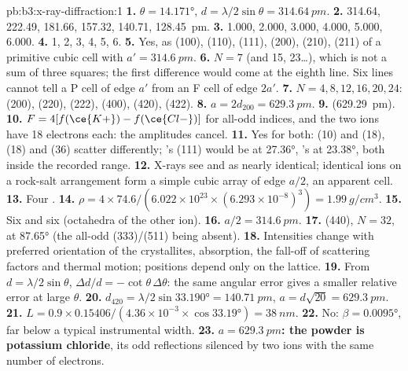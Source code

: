 \begin{solution}{pb:b3:x-ray-diffraction:1}
\textbf{1.} $\theta = \ang{14.171}$, $d = \lambda/2\sin\theta = \qty{314.64}{pm}$.
\textbf{2.} 314.64, 222.49, 181.66, 157.32, 140.71, \qty{128.45}{pm}.
\textbf{3.} 1.000, 2.000, 3.000, 4.000, 5.000, 6.000.
\textbf{4.} 1, 2, 3, 4, 5, 6.
\textbf{5.} Yes, as (100), (110), (111), (200), (210), (211) of a primitive cubic cell
with $a' = \qty{314.6}{pm}$.
\textbf{6.} $N = 7$ (and 15, 23\dots), which is not a sum of three squares; the
first difference would come at the eighth line. Six lines cannot tell a P
cell of edge $a'$ from an F cell of edge $2a'$.
\textbf{7.} $N = 4, 8, 12, 16, 20, 24$: (200), (220), (222), (400), (420), (422).
\textbf{8.} $a = 2d_{200} = \qty{629.3}{pm}$.
\textbf{9.}  (\qty{629.29}{pm}).
\textbf{10.} $F = 4[f(\ce{K+}) - f(\ce{Cl-})]$ for all-odd indices, and the two ions have 18
electrons each: the amplitudes cancel.
\textbf{11.} Yes for both:  (10) and  (18),  (18) and  (36)
scatter differently; 's (111) would be at \ang{27.36}, 's at \ang{23.38},
both inside the recorded range.
\textbf{12.} X-rays see  and  as nearly identical; identical ions on a
rock-salt arrangement form a simple cubic array of edge $a/2$, an apparent cell.
\textbf{13.} Four .
\textbf{14.} $\rho = 4 \times 74.6/(6.022\times10^{23} \times (6.293\times10^{-8})^3) =
\qty{1.99}{g/cm^3}$.
\textbf{15.} Six and six (octahedra of the other ion).
\textbf{16.} $a/2 = \qty{314.6}{pm}$.
\textbf{17.} (440), $N = 32$, at \ang{87.65} (the all-odd (333)/(511) being absent).
\textbf{18.} Intensities change with preferred orientation of the crystallites,
absorption, the fall-off of scattering factors and thermal motion; positions
depend only on the lattice.
\textbf{19.} From $d = \lambda/2\sin\theta$, $\Delta d/d = -\cot\theta\,\Delta\theta$: the same angular error
gives a smaller relative error at large $\theta$.
\textbf{20.} $d_{420} = \lambda/2\sin\ang{33.190} = \qty{140.71}{pm}$, $a = d\sqrt{20} =
\qty{629.3}{pm}$.
\textbf{21.} $L = 0.9 \times 0.15406/(4.36\times10^{-3} \times \cos\ang{33.19}) = \qty{38}{nm}$.
\textbf{22.} No: $\beta = \ang{0.0095}$, far below a typical instrumental width.
\textbf{23.} \textbf{$a = \qty{629.3}{pm}$: the powder is potassium chloride}, its odd
reflections silenced by two ions with the same number of electrons.
\end{solution}
